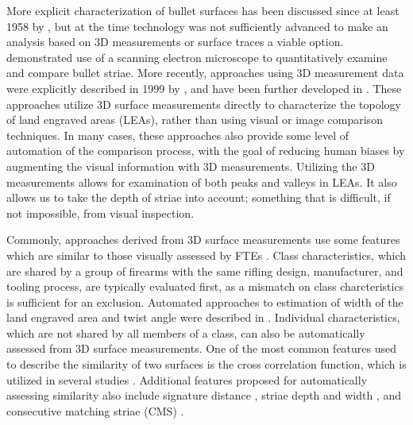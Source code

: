 \documentclass[doubleblind]{elsarticle}\usepackage[]{graphicx}\usepackage[]{color}
\begin{document}
More explicit characterization of bullet surfaces has been discussed since at least 1958 by \citeauthor{davis1968introduction} \cite{davis1968introduction}, but at the time technology was not sufficiently advanced to make an analysis based on 3D measurements or surface traces a viable option. \citet{ComputerIdentificationBullets1978} demonstrated use of a scanning electron microscope to quantitatively examine and compare bullet striae. More recently, approaches using 3D measurement data were explicitly described in 1999 by \citeauthor{dekinderAutomatedComparisonsBullet1999} \cite{dekinderAutomatedComparisonsBullet1999}, and have been further developed in \citep{bachrachDevelopment3DbasedAutomated2002,xieAutomatedBulletidentificationSystem2009, chuPilotStudyAutomated2010}. These approaches utilize 3D surface measurements directly to characterize the topology of land engraved areas (LEAs), rather than using visual or image comparison techniques. In many cases, these approaches also provide some level of automation of the comparison process, with the goal of reducing human biases by augmenting the visual information with 3D measurements. Utilizing the 3D measurements allows for examination of both peaks and valleys in LEAs. It also allows us to take the depth of striae into account; something that is difficult, if not impossible, from visual inspection.

Commonly, approaches derived from 3D surface measurements use some features which are similar to those visually assessed by FTEs \citep{luAutomatedBulletIdentification2014}. Class characteristics, which are shared by a group of firearms with the same rifling design, manufacturer, and tooling process, are typically evaluated first, as a mismatch on class charcteristics is sufficient for an exclusion. Automated approaches to estimation of width of the land engraved area and twist angle were described in \citet{chuPilotStudyAutomated2010}. Individual characteristics, which are not shared by all members of a class, can also be automatically assessed from 3D surface measurements. One of the most common features used to describe the similarity of two surfaces is the cross correlation function, which is utilized in several studies \citep{maNISTBulletSignature2004, vorburgerApplicationsCrosscorrelationFunctions2011, chuPilotStudyAutomated2010}. Additional features proposed for automatically assessing similarity also include signature distance \citep{maNISTBulletSignature2004}, striae depth and width \citep{ComputerIdentificationBullets1978}, and consecutive matching striae (CMS) \citep{chuAutomaticIdentificationBullet2013}.
\end{document}
